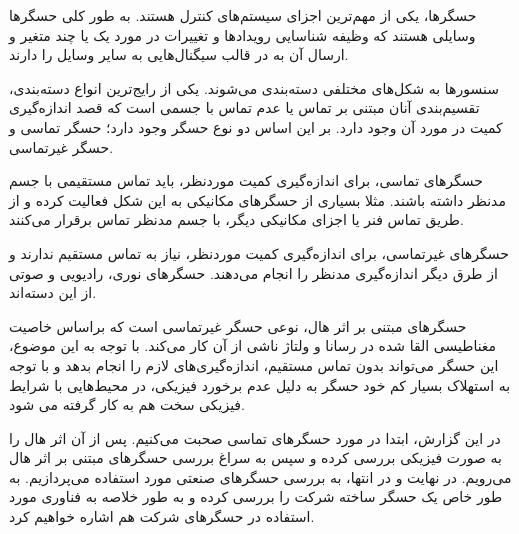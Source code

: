 


حسگرها، یکی از مهم‌ترین اجزای سیستم‌های کنترل هستند. به طور کلی حسگرها وسایلی هستند که وظیفه شناسایی رویدادها و تغییرات در مورد یک یا چند متغیر و ارسال آن به در قالب سیگنال‌هایی به سایر وسایل را دارند.

سنسورها به شکل‌های مختلفی دسته‌بندی می‌شوند. یکی از رایج‌ترین انواع دسته‌بندی، تقسیم‌بندی آنان مبتنی بر تماس یا عدم تماس با جسمی است که قصد اندازه‌گیری کمیت در مورد آن وجود دارد. بر این اساس دو نوع حسگر وجود دارد؛ حسگر تماسی و حسگر غیرتماسی.

حسگر‌های تماسی، برای اندازه‌گیری کمیت موردنظر، باید تماس مستقیمی با جسم مدنظر داشته باشند. مثلا بسیاری از حسگر‌های مکانیکی به این شکل فعالیت کرده و از طریق تماس فنر یا اجزای مکانیکی دیگر، با جسم مدنظر تماس برقرار می‌کنند.

حسگر‌های غیرتماسی، برای اندازه‌گیری کمیت موردنظر، نیاز به تماس مستقیم ندارند و از طرق دیگر اندازه‌گیری مدنظر را انجام می‌دهند. حسگر‌های نوری، رادیویی و صوتی از این دسته‌اند.

حسگرهای مبتنی بر اثر هال، نوعی حسگر غیرتماسی است که براساس خاصیت مغناطیسی القا شده در رسانا و ولتاژ ناشی از آن کار می‌کند. با توجه به این موضوع، این حسگر می‌تواند بدون تماس مستقیم، اندازه‌گیری‌‌های لازم را انجام بدهد و با توجه به استهلاک بسیار کم خود حسگر به دلیل عدم برخورد فیزیکی، در محیط‌هایی با شرایط فیزیکی سخت هم به کار گرفته می شود.

در این گزارش، ابتدا در مورد حسگر‌های تماسی صحبت می‌کنیم. پس از آن اثر هال را به صورت فیزیکی بررسی کرده و سپس به سراغ بررسی حسگرهای مبتنی بر اثر هال می‌رویم. در نهایت و در انتها، به بررسی حسگرهای صنعتی مورد استفاده می‌پردازیم. به طور خاص یک حسگر ساخته شرکت
را بررسی کرده و به طور خلاصه به فناوری مورد استفاده در حسگر‌های شرکت  هم اشاره خواهیم کرد.

